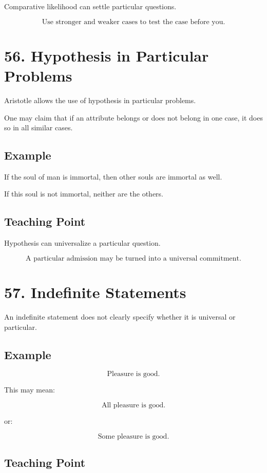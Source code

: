 \documentclass[12pt]{article}
\begin{document}
Comparative likelihood can settle particular questions.

\[
\boxed{
\text{Use stronger and weaker cases to test the case before you.}
}
\]

\section*{56. Hypothesis in Particular Problems}

Aristotle allows the use of hypothesis in particular problems.

One may claim that if an attribute belongs or does not belong in one case, it
does so in all similar cases.

\subsection*{Example}

If the soul of man is immortal, then other souls are immortal as well.

If this soul is not immortal, neither are the others.

\subsection*{Teaching Point}

Hypothesis can universalize a particular question.

\[
\boxed{
\text{A particular admission may be turned into a universal commitment.}
}
\]

\section*{57. Indefinite Statements}

An indefinite statement does not clearly specify whether it is universal or
particular.

\subsection*{Example}

\[
\text{Pleasure is good.}
\]

This may mean:

\[
\text{All pleasure is good.}
\]

or:

\[
\text{Some pleasure is good.}
\]

\subsection*{Teaching Point}
\end{document}
